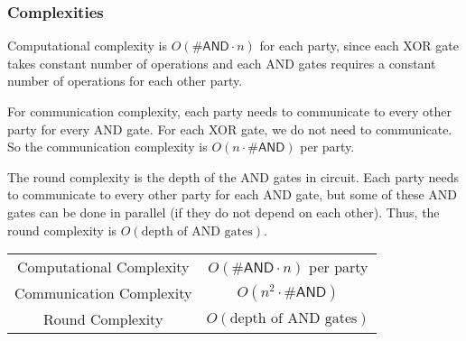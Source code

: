 \subsubsection{Complexities}
Computational complexity is $O(\#\mathsf{AND}\cdot n)$ for each party, since each XOR gate takes constant number of operations and each AND gates requires a constant number of operations for each other party.

For communication complexity, each party needs to communicate to every other party for every \textsf{AND} gate. For each XOR gate, we do not need to communicate. So the communication complexity is $O(n \cdot \#\mathsf{AND})$ per party.

The round complexity is the depth of the AND gates in circuit. Each party needs to communicate to every other party for each AND gate, but some of these AND gates can be done in parallel (if they do not depend on each other). Thus, the round complexity is $O(\text{depth of AND gates})$.

\begin{center}
\begin{tabular}{c|c} 
Computational Complexity & $O(\#\mathsf{AND}\cdot n)$ per party\\
Communication Complexity & $O(n^2\cdot \#\mathsf{AND})$\\
Round Complexity & $O(\text{depth of AND gates})$
\end{tabular}
\end{center}